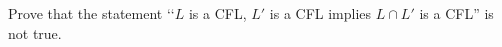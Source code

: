 Prove that the statement \lq\lq $L$ is a CFL, $L'$ is a  CFL implies
$L \cap L'$ is a CFL'' is not true.
